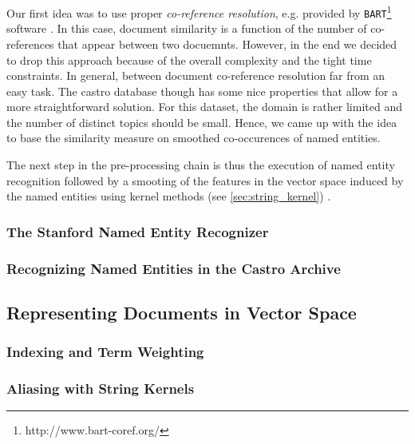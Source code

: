 Our first idea was to use proper \textit{co-reference resolution}, e.g. provided by
\texttt{BART}\footnote{http://www.bart-coref.org/} software \cite{bart}. In this case, document
similarity is a function of the number of co-references that appear between two docuemnts. However,
in the end we decided to drop this approach because of the overall complexity and the tight time
constraints. In general, between document co-reference resolution far from an easy task. The castro
database though has some nice properties that allow for a more straightforward solution. For this
dataset, the domain is rather limited and the number of distinct topics should be small. Hence, we
came up with the idea to base the similarity measure on smoothed co-occurences of named entities.

The next step in the pre-processing chain is thus the execution of named entity recognition followed
by a smooting of the features in the vector space induced by the named entities using kernel
methods (see \ref{sec:string_kernel}) \cite{string_kernel_coref}.

\subsubsection{The Stanford Named Entity Recognizer}
\label{sec:stanford_named_entity_recognizer}

\subsubsection{Recognizing Named Entities in the Castro Archive}
\label{sec:recognizing_named_enitiies_in_the_castro_archive}

\subsection{Representing Documents in Vector Space}
\label{sec:representing_documents_in_vector_space}

\subsubsection{Indexing and Term Weighting}
\label{sec:indexing_term_weighting}

\subsubsection{Aliasing with String Kernels}
\label{sec:aliasing_string_kernel}

